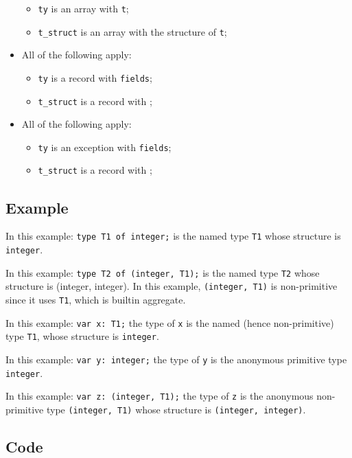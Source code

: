 \documentclass{book}
\begin{document}
\begin{itemize}
      \begin{itemize}
      \item \texttt{ty} is an array with \texttt{t};
      \item \texttt{t\_struct} is an array with the structure of \texttt{t};
      \end{itemize}
    \item All of the following apply:
      \begin{itemize}
      \item \texttt{ty} is a record with \texttt{fields};
      \item \texttt{t\_struct} is a record with ;
      \end{itemize}
    \item All of the following apply:
      \begin{itemize}
      \item \texttt{ty} is an exception with \texttt{fields};
      \item \texttt{t\_struct} is a record with ;
      \end{itemize}
    \end{itemize}
      
    \subsection{Example}
    In this example:
    \texttt{type T1 of integer;} is the named type \texttt{T1}
whose structure is \texttt{integer}.

    In this example:
    \texttt{type T2 of (integer, T1);}
    is the named type \texttt{T2} whose structure is (integer, integer). In this
    example, \texttt{(integer, T1)} is non-primitive since it uses \texttt{T1}, which is builtin aggregate.

    In this example:
    \texttt{var x: T1;}
    the type of \texttt{x} is the named (hence non-primitive) type \texttt{T1}, whose structure
    is \texttt{integer}.

    In this example:
    \texttt{var y: integer;}
    the type of \texttt{y} is the anonymous primitive type \texttt{integer}.

    In this example:
    \texttt{var z: (integer, T1);}
    the type of \texttt{z} is the anonymous non-primitive type
\texttt{(integer, T1)} whose structure is \texttt{(integer, integer)}.

    \subsection{Code}
\end{document}

